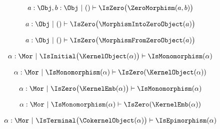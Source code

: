 \begin{sequent}
\begin{align*}
   a: \Obj, b: \Obj ~|~ () \vdash \IsZero \big( \ZeroMorphism( a, b ) \big)
\end{align*}
\end{sequent}

\begin{sequent}
\begin{align*}
   a: \Obj ~|~ () \vdash \IsZero \big( \MorphismIntoZeroObject( a ) \big)
\end{align*}
\end{sequent}

\begin{sequent}
\begin{align*}
   a: \Obj ~|~ () \vdash \IsZero \big( \MorphismFromZeroObject( a ) \big)
\end{align*}

\end{sequent}


\begin{sequent}
\begin{align*}
  \alpha: \Mor ~|~ \IsInitial\big( \KernelObject( \alpha ) \big) \vdash \IsMonomorphism( \alpha )
\end{align*}
\end{sequent}

\begin{sequent}
\begin{align*}
  \alpha: \Mor ~|~ \IsMonomorphism( \alpha ) \vdash \IsZero( \KernelObject( \alpha ) )
\end{align*}
\end{sequent}

\begin{sequent}
\begin{align*}
  \alpha: \Mor ~|~ \IsZero\big( \KernelEmb( \alpha ) \big) \vdash \IsMonomorphism( \alpha )
\end{align*}
\end{sequent}

\begin{sequent}
\begin{align*}
  \alpha: \Mor ~|~ \IsMonomorphism( \alpha ) \vdash \IsZero( \KernelEmb( \alpha ) )
\end{align*}
\end{sequent}

\begin{sequent}
\begin{align*}
  \alpha: \Mor ~|~ \IsTerminal\big( \CokernelObject( \alpha ) \big) \vdash \IsEpimorphism( \alpha )
\end{align*}
\end{sequent}

